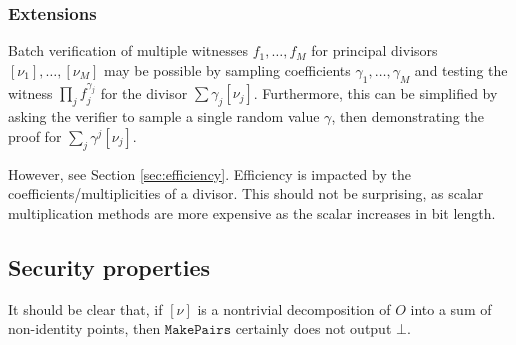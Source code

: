 \documentclass[11pt,letterpaper]{article}
\theoremstyle{definition}
\newcommand{\6}{\mathbf}
\newcommand{\7}{\mathcal}
\begin{document}
\subsubsection{Extensions}
Batch verification of multiple witnesses $f_1, \ldots, f_M$ for principal divisors $[\nu_1], \ldots, [\nu_M]$ may be possible by sampling coefficients $\gamma_1, \ldots, \gamma_M$ and testing the witness $\prod_j f_j^{\gamma_j}$ for the divisor $\sum \gamma_j [\nu_j]$. 
Furthermore, this can be simplified by asking the verifier to sample a single random value $\gamma$, then demonstrating the proof for $\sum_j \gamma^j [\nu_j]$. 

However, see Section \ref{sec:efficiency}. Efficiency is impacted by the coefficients/multiplicities of a divisor. This should not be surprising, as scalar multiplication methods are more expensive as the scalar increases in bit length.


\subsection{Security properties}\label{sec:SecurityProps}

It should be clear that, if $[\nu]$ is a nontrivial decomposition of $O$ into a sum of non-identity points, then $\texttt{MakePairs}$ certainly does not output $\bot$. 
\end{document}
